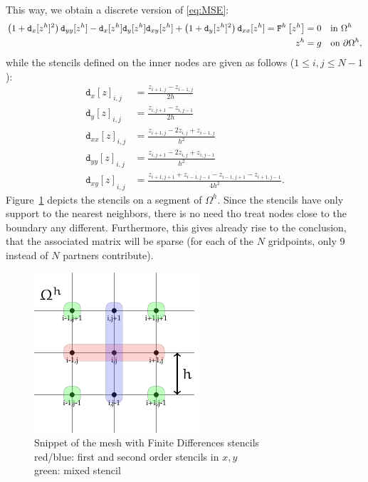 \documentclass[11pt]{scrartcl}
\newcommand{\mSurfDisc}[1]{\ensuremath{\mathtt{F}^h\left[#1\right]}}
\newcommand{\Dx}[1]{\ensuremath{\mathtt{d}_x[#1]}}
\newcommand{\Dy}[1]{\ensuremath{\mathtt{d}_y[#1]}}
\newcommand{\Dxx}[1]{\ensuremath{\mathtt{d}_{xx}[#1]}}
\newcommand{\Dyy}[1]{\ensuremath{\mathtt{d}_{yy}[#1]}}
\newcommand{\Dxy}[1]{\ensuremath{\mathtt{d}_{xy}[#1]}}
\begin{document}
This way, we obtain a discrete version of \eqref{eq:MSE}:
\begin{align}
	\left(1+\Dx{z^h}^2\right)\Dyy{z^h}-\Dx{z^h} \Dy{z^h}\Dxy{z^h} + \left(1+\Dy{z^h}^2\right)\Dxx{z^h} = \mSurfDisc{z^h} &= 0  \quad \text{in } \Omega^h \notag \\
	z^h &= g \quad \text{on } \partial\Omega^h \label{eq:dMSE},
\end{align}
while the stencils defined on the inner nodes are given as follows ($1 \le i,j \le N-1$):
\begin{align}
	\Dx{z}_{i,j} &= \frac{z_{i+1,j}-z_{i-1,j}}{2h}\label{eq:dx} \\
	\Dy{z}_{i,j} &= \frac{z_{i,j+1}-z_{i,j-1}}{2h}\label{eq:dy} \\
	\Dxx{z}_{i,j} &= \frac{z_{i+1,j} - 2z_{i,j} + z_{i-1,j}}{h^2}\label{eq:dxx}\\
	\Dyy{z}_{i,j} &= \frac{z_{i,j+1} - 2z_{i,j} + z_{i,j-1}}{h^2}\label{eq:dyy}\\
	\Dxy{z}_{i,j} &= \frac{z_{i+1,j+1} + z_{i-1,j-1} - z_{i-1,j+1}-z_{i+1,j-1}}{4h^2}\label{eq:dxy}. 
\end{align}
Figure~\ref{fig:fdmmesh} depicts the stencils on a segment of $\Omega^h$.
Since the stencils have only support to the nearest neighbors, there is no need tho treat nodes close to the boundary any different. Furthermore, this gives already rise to the conclusion, that the associated matrix will be sparse (for each of the $N$ gridpoints, only 9 instead of $N$ partners contribute).

\begin{figure}
	\centering
	\includegraphics[width=.4\linewidth]{figs/FDMMesh}
	\caption{Snippet of the mesh with Finite Differences stencils\\red/blue: first and second order stencils in $x,y$\\
	green: mixed stencil}\label{fig:fdmmesh}
\end{figure}
\newpage
\end{document}
